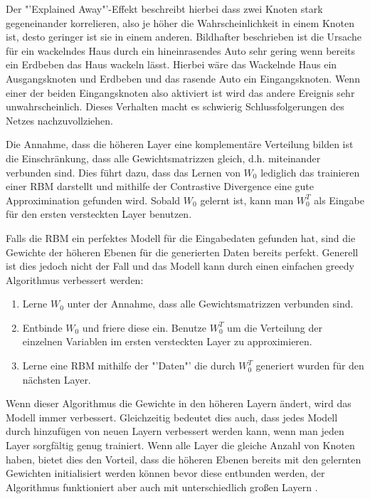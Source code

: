 \documentclass[12pt]{article}
\begin{document}
Der "'Explained Away"'-Effekt beschreibt hierbei dass zwei Knoten stark gegeneinander korrelieren, also je höher die Wahrscheinlichkeit in einem Knoten ist, desto geringer ist sie in einem anderen. Bildhafter beschrieben ist die Ursache für ein wackelndes Haus durch ein hineinrasendes Auto sehr gering wenn bereits ein Erdbeben das Haus wackeln lässt. Hierbei wäre das Wackelnde Haus ein Ausgangsknoten und Erdbeben und das rasende Auto ein Eingangsknoten. Wenn einer der beiden Eingangsknoten also aktiviert ist wird das andere Ereignis sehr unwahrscheinlich. Dieses Verhalten macht es schwierig Schlussfolgerungen des Netzes nachzuvollziehen.  

Die Annahme, dass die höheren Layer eine komplementäre Verteilung bilden ist die Einschränkung, dass alle Gewichtsmatrizzen gleich, d.h. miteinander verbunden sind. Dies führt dazu, dass das Lernen von $W_0$ lediglich das trainieren einer RBM darstellt und mithilfe der Contrastive Divergence eine gute Approximination gefunden wird. Sobald $W_0$ gelernt ist, kann man $W^T_0$ als Eingabe für den ersten versteckten Layer benutzen.

Falls die RBM ein perfektes Modell für die Eingabedaten gefunden hat, sind die Gewichte der höheren Ebenen für die generierten Daten bereits perfekt. Generell ist dies jedoch nicht der Fall und das Modell kann durch einen einfachen greedy Algorithmus verbessert werden:

\begin{enumerate}
\item Lerne $W_0$ unter der Annahme, dass alle Gewichtsmatrizzen verbunden sind.
\item Entbinde $W_0$ und friere diese ein. Benutze $W_0^T$ um die Verteilung der einzelnen Variablen im ersten versteckten Layer zu approximieren.
\item Lerne eine RBM mithilfe der "'Daten"' die durch $W_0^T$ generiert wurden für den nächsten Layer.
\end{enumerate}

Wenn dieser Algorithmus die Gewichte in den höheren Layern ändert, wird das Modell immer verbessert. Gleichzeitig bedeutet dies auch, dass jedes Modell durch hinzufügen von neuen Layern verbessert werden kann, wenn man jeden Layer sorgfältig genug trainiert. Wenn alle Layer die gleiche Anzahl von Knoten haben, bietet dies den Vorteil, dass die höheren Ebenen bereits mit den gelernten Gewichten initialisiert werden können bevor diese entbunden werden, der Algorithmus funktioniert aber auch mit unterschiedlich großen Layern \cite{learning}.
\end{document}
